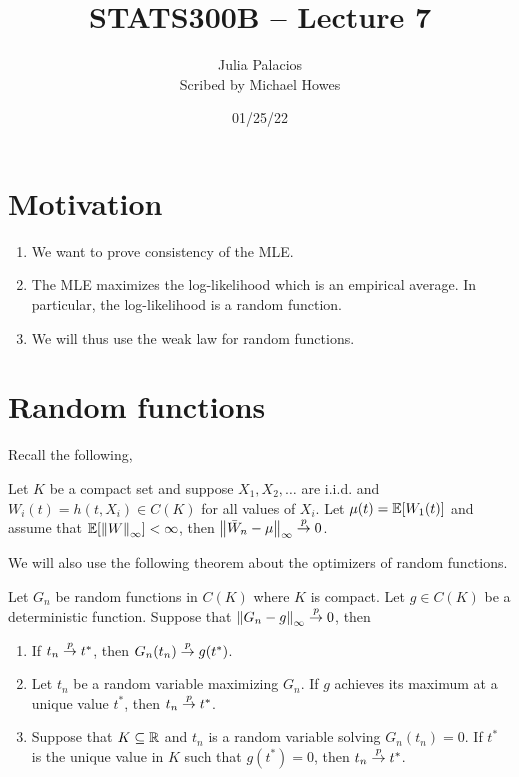 




\title{STATS300B -- Lecture 7}
\author{Julia Palacios\\ Scribed by Michael Howes}
\date{01/25/22}

\pagestyle{fancy}
\fancyhf{}


\maketitle
\tableofcontents
\section{Motivation}
\begin{enumerate}
    \item We want to prove consistency of the MLE.
    \item The MLE maximizes the log-likelihood which is an empirical average. In particular, the log-likelihood is a random function.
    \item We will thus use the weak law for random functions.
\end{enumerate}
\section{Random functions}
Recall the following,
\begin{theorem}
    Let $K$ be a compact set and suppose $X_1,X_2,\ldots$ are i.i.d. and $W_i(t)=h(t,X_i) \in C(K)$ for all values of $X_i$. Let $\mu(t) = {\mathbb{E}}[W_1(t)]$ and assume that ${\mathbb{E}}[\left\|W\right\|_\infty] < \infty$, then $\left\|\bar{W}_n -\mu\right\|_\infty \stackrel{p}{\to} 0$.
\end{theorem}
We will also use the following theorem about the optimizers of random functions.
\begin{theorem}
    Let $G_n$ be random functions in $C(K)$ where $K$ is compact. Let $g \in C(K)$ be a deterministic function. Suppose that $\left\|G_n - g\right\|_\infty \stackrel{p}{\to} 0$, then
    \begin{enumerate}
        \item If $t_n \stackrel{p}{\to} t^*$, then $G_n(t_n)\stackrel{p}{\to} g(t^*)$.
        \item Let $t_n$ be a random variable maximizing $G_n$. If $g$ achieves its maximum at a unique value $t^*$, then $t_n \stackrel{p}{\to} t^*$.
        \item Suppose that $K \subseteq {\mathbb R}$ and $t_n$ is a random variable solving $G_n(t_n)=0$. If $t^*$ is the unique value in $K$ such that $g(t^*)=0$, then $t_n \stackrel{p}{\to} t^*$.
    \end{enumerate}
\end{theorem}
